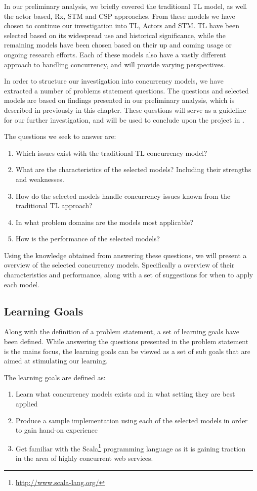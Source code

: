 In our preliminary analysis, we briefly covered the traditional \ac{TL} model, as well the actor based, \ac{Rx}, \ac{STM} and \ac{CSP} approaches. From these models we have chosen to continue our investigation into \ac{TL}, Actors and \ac{STM}. \ac{TL} have been selected based on its widespread use and historical significance, while the remaining models have been chosen based on their up and coming usage or ongoing research efforts. Each of these models also have a vastly different approach to handling concurrency, and will provide varying perspectives.

In order to structure our investigation into concurrency models, we have extracted a number of problems statement questions. The questions and selected models are based on findings presented in our preliminary analysis, which is described in previously in this chapter. These questions will serve as a guideline for our further investigation, and will be used to conclude upon the project in .

The questions we seek to answer are:
\begin{enumerate}
\item Which issues exist with the traditional \ac{TL} concurrency model?
\item What are the characteristics of the selected models? Including their strengths and weaknesses.
\item How do the selected models handle concurrency issues known from the traditional \ac{TL} approach?
\item In what problem domains are the models most applicable?
\item How is the performance of the selected models?
\end{enumerate}

Using the knowledge obtained from answering these questions, we will present a overview of the selected concurrency models. Specifically a overview of their characteristics and performance, along with a set of suggestions for when to apply each model.

\subsection{Learning Goals}
Along with the definition of a problem statement, a set of learning goals have been defined. While answering the questions presented in the problem statement is the mains focus, the learning goals can be viewed as a set of sub goals that are aimed at stimulating our learning.

The learning goals are defined as:
\begin{enumerate}
\item Learn what concurrency models exists and in what setting they are best applied
\item Produce a sample implementation using each of the selected models in order to gain hand-on experience
\item Get familiar with the Scala\footnote{\url{http://www.scala-lang.org/}} programming language as it is gaining traction in the area of highly concurrent web services. 
\end{enumerate}

\worksheetend
